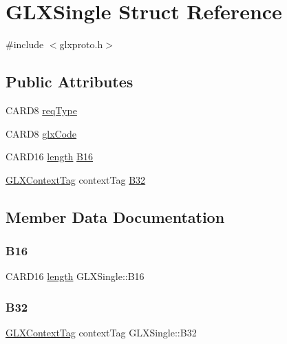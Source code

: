 \hypertarget{struct_g_l_x_single}{}\section{G\+L\+X\+Single Struct Reference}
\label{struct_g_l_x_single}


{\ttfamily \#include $<$glxproto.\+h$>$}

\subsection*{Public Attributes}
\begin{DoxyCompactItemize}
\item 
C\+A\+R\+D8 \hyperlink{struct_g_l_x_single_a31797c1975abccb7ba81bb4753acc51c}{req\+Type}
\item 
C\+A\+R\+D8 \hyperlink{struct_g_l_x_single_a5ecf5ecd2ba8596e9ee5af175225613f}{glx\+Code}
\item 
C\+A\+R\+D16 \hyperlink{glcorearb_8h_ab9c919755bde3b34349e23a32b4e0fa7}{length} \hyperlink{struct_g_l_x_single_ae0e914d2ddb9d4ff79f873990efa3c5b}{B16}
\item 
\hyperlink{glxproto_8h_ae71763ce00c9fa460beb4699af678691}{G\+L\+X\+Context\+Tag} context\+Tag \hyperlink{struct_g_l_x_single_a79d8d9d0d384c97b0d6656c72b733cfa}{B32}
\end{DoxyCompactItemize}


\subsection{Member Data Documentation}
\mbox{\label{struct_g_l_x_single_ae0e914d2ddb9d4ff79f873990efa3c5b}} 
\subsubsection{\texorpdfstring{B16}{B16}}
{\footnotesize\ttfamily C\+A\+R\+D16 \hyperlink{glcorearb_8h_ab9c919755bde3b34349e23a32b4e0fa7}{length} G\+L\+X\+Single\+::\+B16}

\mbox{\label{struct_g_l_x_single_a79d8d9d0d384c97b0d6656c72b733cfa}} 
\subsubsection{\texorpdfstring{B32}{B32}}
{\footnotesize\ttfamily \hyperlink{glxproto_8h_ae71763ce00c9fa460beb4699af678691}{G\+L\+X\+Context\+Tag} context\+Tag G\+L\+X\+Single\+::\+B32}

